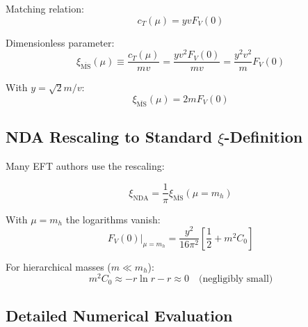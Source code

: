 	Matching relation:
	\begin{equation}
		c_T(\mu) = y v F_V(0)
	\end{equation}
	
	Dimensionless parameter:
	\begin{equation}
		\xi_{\overline{\text{MS}}}(\mu) \equiv \frac{c_T(\mu)}{mv} = \frac{yv^2F_V(0)}{mv} = \frac{y^2v^2}{m}F_V(0)
	\end{equation}
	
	With $y = \sqrt{2} m/v$:
	\begin{equation}
		\xi_{\overline{\text{MS}}}(\mu) = 2mF_V(0)
	\end{equation}
	
	\subsection{NDA Rescaling to Standard $\xi$-Definition}
	
	Many EFT authors use the rescaling:
	
	\begin{equation}
		\xi_{\text{NDA}} = \frac{1}{\pi} \xi_{\overline{\text{MS}}}(\mu = m_h)
	\end{equation}
	
	With $\mu = m_h$ the logarithms vanish:
	\begin{equation}
		F_V(0)|_{\mu=m_h} = \frac{y^2}{16\pi^2}\left[\frac{1}{2} + m^2C_0\right]
	\end{equation}
	
	For hierarchical masses ($m \ll m_h$):
	\begin{equation}
		m^2C_0 \approx -r \ln r - r \approx 0 \quad \text{(negligibly small)}
	\end{equation}
	
	\subsection{Detailed Numerical Evaluation}
	
